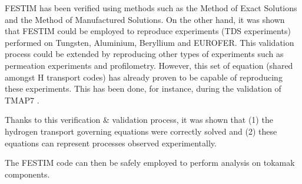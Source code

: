 FESTIM has been verified using methods such as the Method of Exact Solutions and the Method of Manufactured Solutions.
On the other hand, it was shown that FESTIM could be employed to reproduce experiments (TDS experiments) performed on Tungsten, Aluminium, Beryllium and EUROFER.
This validation process could be extended by reproducing other types of experiments such as permeation experiments and profilometry.
However, this set of equation (shared amongst H transport codes) has already proven to be capable of reproducing these experiments.
This has been done, for instance, during the validation of TMAP7 .

Thanks to this verification \& validation process, it was shown that (1) the hydrogen transport governing equations were correctly solved and (2) these equations can represent processes observed experimentally.

The FESTIM code can then be safely employed to perform analysis on tokamak components.
